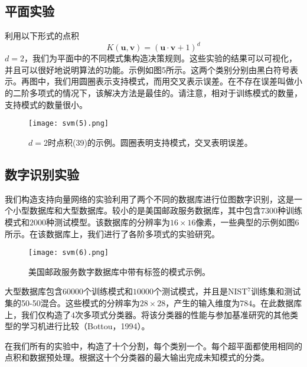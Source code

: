 \documentclass[lang=cn,11pt,a4paper]{elegantpaper}
\begin{document}
	\subsection{平面实验}
	利用以下形式的点积
	\begin{equation}
		K(\mathbf{u},\mathbf{v})=(\mathbf{u}·\mathbf{v}+1)^d \tag{39}
	\end{equation}
	$d=2$，我们为平面中的不同模式集构造决策规则。这些实验的结果可以可视化，并且可以很好地说明算法的功能。示例如图5所示。这两个类别分别由黑白符号表示。再图中，我们用圆圈表示支持模式，而用交叉表示误差。在不存在误差叫做小的二阶多项式的情况下，该解决方法是最佳的。请注意，相对于训练模式的数量，支持模式的数量很小。
	\begin{figure}[htbp]
		\centering
		\texttt{[image: svm(5).png]}
		\caption{$d=2$时点积(39)的示例。圆圈表明支持模式，交叉表明误差。}
	\end{figure}

	\subsection{数字识别实验}
	我们构造支持向量网络的实验利用了两个不同的数据库进行位图数字识别，这是一个小型数据库和大型数据库。较小的是美国邮政服务数据库，其中包含$7300$种训练模式和$2000$种测试模型。该数据库的分辨率为$16\times16$像素，一些典型的示例如图6所示。在该数据库上，我们进行了各阶多项式的实验研究。
	\begin{figure}[htbp]
		\centering
		\texttt{[image: svm(6).png]}
		\caption{美国邮政服务数字数据库中带有标签的模式示例。}
	\end{figure}
	大型数据库包含$60000$个训练模式和$10000$个测试模式，并且是NIST$^7$训练集和测试集的50-50混合。这些模式的分辨率为$28\times28$，产生的输入维度为$784$。在此数据库上，我们仅构造了$4$次多项式分类器。将该分类器的性能与参加基准研究的其他类型的学习机进行比较（Bottou，1994）。

	在我们所有的实验中，构造了十个分割，每个类别一个。每个超平面都使用相同的点积和数据预处理。根据这十个分类器的最大输出完成未知模式的分类。
\end{document}
